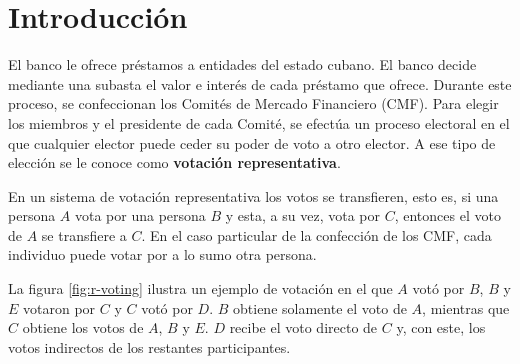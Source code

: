\chapter*{Introducción}\label{chapter:introduction}




El banco  le ofrece pr\'estamos a entidades del estado cubano.  El banco  decide mediante una subasta el valor e inter\'es de cada pr\'estamo que ofrece. Durante este proceso, se confeccionan los Comit\'es de Mercado Financiero (CMF).  Para elegir los miembros y el presidente de cada Comit\'e, se efect\'ua un proceso electoral en el que cualquier elector puede ceder su poder de voto a otro elector. A ese tipo de elecci\'on se le conoce como \textbf{votaci\'on representativa}.   

En un sistema de votaci\'on representativa  los votos se transfieren, esto es, si una persona $A$ vota por una persona $B$ y esta, a su vez, vota por  $C$, entonces el voto de $A$ se transfiere a $C$. En el caso particular de la confecci\'on de los CMF, cada individuo puede votar por a lo sumo otra persona.

La figura \ref{fig:r-voting} ilustra un ejemplo de votación en el que $A$ votó por $B$, $B$ y $E$ votaron por $C$ y $C$ votó por $D$. $B$ obtiene solamente el voto de $A$, mientras que $C$ obtiene los votos de $A$, $B$ y $E$. $D$ recibe el voto directo de $C$ y, con este,  los votos indirectos de los restantes participantes.


